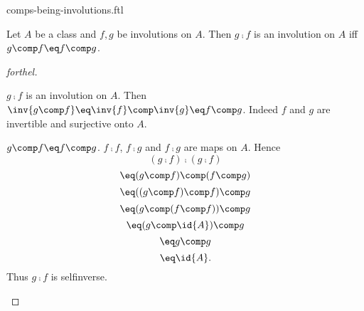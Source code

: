 \documentclass{naproche-library}
\begin{document}
\begin{smodule}[title=Compositions Being Involutions]{comps-being-involutions.ftl}


\begin{proposition}[forthel,id=CompInvolProp]
  Let $A$ be a class and $f, g$ be involutions on $A$.
  Then $g \comp f$ is an involution on $A$ iff $g \comp f \eq f \comp g$.
\end{proposition}
\begin{proof}[forthel]
  \begin{case}{$g \comp f$ is an involution on $A$.}
    Then $\inv{g \comp f}
      \eq \inv{f} \comp \inv{g}
      \eq f \comp g$.
    Indeed $f$ and $g$ are invertible and surjective onto $A$.
  \end{case}

  \begin{case}{$g \comp f \eq f \comp g$.}
    $f \comp f$, $f \comp g$ and $f \comp g$ are maps on $A$.
    Hence
    \[  (g \comp f) \comp (g \comp f)       \]
    \[    \eq (g \comp f) \comp (f \comp g)   \]
    \[    \eq ((g \comp f) \comp f) \comp g   \]
    \[    \eq (g \comp (f \comp f)) \comp g   \]
    \[    \eq (g \comp \id{A}) \comp g       \]
    \[    \eq g \comp g                       \]
    \[    \eq \id{A}.                        \]
    Thus $g \comp f$ is selfinverse.
  \end{case}
\end{proof}

\end{smodule}
\end{document}
